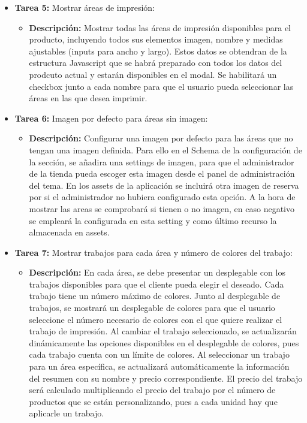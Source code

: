 \documentclass[12pt]{article}
\begin{document}
\begin{itemize}
\begin{itemize}[label=--]
          \end{itemize}
    \item \textbf{Tarea 5:} Mostrar áreas de impresión:
          \begin{itemize}[label=--]
              \item \textbf{Descripción:} Mostrar todas las áreas de impresión disponibles para el producto, incluyendo todos sus elementos imagen, nombre y medidas ajustables (inputs para ancho y largo). Estos datos se obtendran de la estructura Javascript que se habrá preparado con todos los datos del prodcuto actual y estarán disponibles en el modal. Se habilitará un checkbox junto a cada nombre para que el usuario pueda seleccionar las áreas en las que desea imprimir.
          \end{itemize}
    \item \textbf{Tarea 6:} Imagen por defecto para áreas sin imagen:
          \begin{itemize}[label=--]
              \item \textbf{Descripción:} Configurar una imagen por defecto para las áreas que no tengan una imagen definida. Para ello en el Schema de la configuración de la sección, se añadira una settings de imagen, para que el administrador de la tienda pueda escoger esta imagen desde el panel de administración del tema. En los assets de la aplicación se incluirá otra imagen de reserva por si el administrador no hubiera configurado esta opción. A la hora de mostrar las areas se comprobará si tienen o no imagen, en caso negativo se empleará la configurada en esta setting y como último recurso la almacenada en assets.
          \end{itemize}
    \item \textbf{Tarea 7:} Mostrar trabajos para cada área y número de colores del trabajo:
          \begin{itemize}[label=--]
              \item \textbf{Descripción:} En cada área, se debe presentar un desplegable con los trabajos disponibles para que el cliente pueda elegir el deseado. Cada trabajo tiene un número máximo de colores. Junto al desplegable de trabajos, se mostrará un desplegable de colores para que el usuario seleccione el número necesario de colores con el que quiere realizar el trabajo de impresión. Al cambiar el trabajo seleccionado, se actualizarán dinámicamente las opciones disponibles en el desplegable de colores, pues cada trabajo cuenta con un límite de colores. Al seleccionar un trabajo para un área específica, se actualizará automáticamente la información del resumen con su nombre y precio correspondiente. El precio del trabajo será calculado multiplicando el precio del trabajo por el número de productos que se están personalizando, pues a cada unidad hay que aplicarle un trabajo.

\end{itemize}
\end{itemize}
\end{document}
